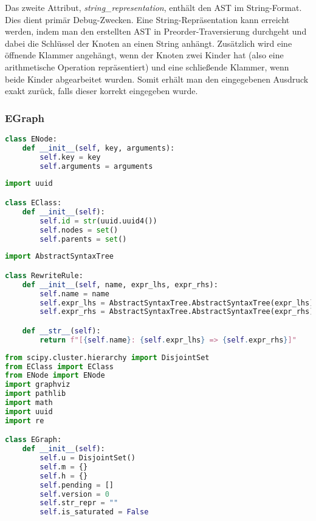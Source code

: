 Das zweite Attribut, \textit{string\_representation}, enthält den AST im String-Format. Dies dient primär Debug-Zwecken.
Eine String-Repräsentation kann erreicht werden, indem man den erstellten AST in Preorder-Traversierung durchgeht und dabei die Schlüssel der Knoten an einen String anhängt.
Zusätzlich wird eine öffnende Klammer angehängt, wenn der Knoten zwei Kinder hat (also eine arithmetische Operation repräsentiert) und eine schließende Klammer,
wenn beide Kinder abgearbeitet wurden. Somit erhält man den eingegebenen Ausdruck exakt zurück, falls dieser korrekt eingegeben wurde.

\subsubsection{EGraph}

\begin{lstlisting}[language=Python, caption=Klasse \textit{ENode}]
class ENode:
    def __init__(self, key, arguments):
        self.key = key
        self.arguments = arguments
\end{lstlisting}

\begin{lstlisting}[language=Python, caption=Klasse \textit{EClass}]
import uuid

class EClass:
    def __init__(self):
        self.id = str(uuid.uuid4())
        self.nodes = set()
        self.parents = set()
\end{lstlisting}

\begin{lstlisting}[language=Python, caption=Klasse \textit{RewriteRule}]
import AbstractSyntaxTree

class RewriteRule:
    def __init__(self, name, expr_lhs, expr_rhs):
        self.name = name
        self.expr_lhs = AbstractSyntaxTree.AbstractSyntaxTree(expr_lhs)
        self.expr_rhs = AbstractSyntaxTree.AbstractSyntaxTree(expr_rhs)

    def __str__(self):
        return f"[{self.name}: {self.expr_lhs} => {self.expr_rhs}]"
\end{lstlisting}

\begin{lstlisting}[language=Python, caption=Klasse \textit{EGraph}]
from scipy.cluster.hierarchy import DisjointSet
from EClass import EClass
from ENode import ENode
import graphviz
import pathlib
import math
import uuid
import re

class EGraph:
    def __init__(self):
        self.u = DisjointSet()
        self.m = {}
        self.h = {}
        self.pending = []
        self.version = 0
        self.str_repr = ""
        self.is_saturated = False
\end{lstlisting}

